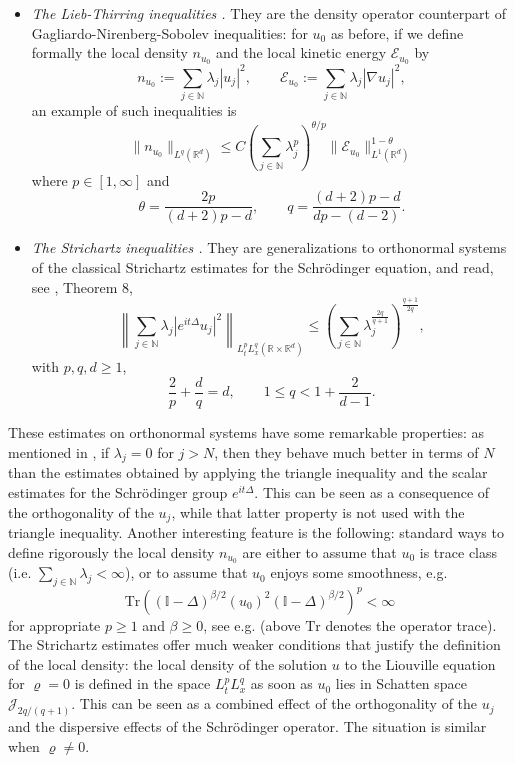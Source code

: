 \documentclass[12pt]{article}
\def \Rm {\mathbb R}
\def \Nm {\mathbb N}
\def\II{\mathbb{I}}
\newcommand{\calE}{\mathcal E}
\newcommand{\Tr}{\textrm{Tr}}
\newcommand{\calJ}{\mathcal J}
\newcommand{\be}{\begin{equation}}
\newcommand{\ee}{\end{equation}}
\begin{document}
\begin{itemize}
\item[-] \textit{The Lieb-Thirring inequalities \cite{LT,LP}.} They are the density operator counterpart of Gagliardo-Nirenberg-Sobolev inequalities: for $u_0$ as before, if we define formally the local density $n_{u_0}$ and the local kinetic energy $\calE_{u_0}$ by
$$
n_{u_0}:=\sum_{j \in \Nm} \lambda_j |u_j|^2, \qquad \calE_{u_0}:=\sum_{j \in \Nm} \lambda_j |\nabla u_j|^2,
$$
an example of such inequalities is 
$$
\|n_{u_0}\|_{L^q(\Rm^d)} \leq C \left(\sum_{j \in \Nm} \lambda_j^p \right)^{\theta/p} \|\calE_{u_0}\|^{1-\theta}_{L^1(\Rm^d)}
$$
where $p \in [1,\infty]$ and
$$
\theta=\frac{2p}{(d+2)p-d}, \qquad q=\frac{(d+2)p-d}{dp-(d-2)}.
$$
\item[-] \textit{The Strichartz inequalities \cite{LewStri,FrankSabin}.} They are generalizations to orthonormal systems of the classical Strichartz estimates for the Schr\"odinger equation, and read, see \cite{FrankSabin}, Theorem 8,
$$
\left\|\sum_{j \in \Nm} \lambda_j |e^{i t\Delta}u_j|^2 \right\|_{L^p_tL^q_x(\Rm\times \Rm^d)} \leq \left( \sum_{j \in \Nm} \lambda_j^{\frac{2q}{q+1}}\right)^{\frac{q+1}{2q}},$$
with $p,q,d \geq 1$,
$$
\frac{2}{p}+\frac{d}{q}=d, \qquad 1 \leq q <1+\frac{2}{d-1}.
$$
\end{itemize}

These estimates on orthonormal systems have some remarkable properties: as mentioned in \cite{LewStri,FrankSabin}, if $\lambda_j=0$ for $j>N$, then they behave much better in terms of $N$ than the estimates obtained by applying the triangle inequality and the scalar estimates for the Schr\"odinger group $e^{i t\Delta}$. This can be seen as a consequence of the orthogonality of the $u_j$, while that latter property is not used with the triangle inequality. Another interesting feature is the following: standard ways to define rigorously the local density $n_{u_0}$ are either to assume that $u_0$ is trace class (i.e. $\sum_{j \in \Nm} \lambda_j < \infty$), or to assume that $u_0$ enjoys some smoothness, e.g. 
\be \label{regu0}\Tr \left((\II-\Delta)^{\beta/2} (u_0)^2 (\II-\Delta)^{\beta/2}\right)^p < \infty
\ee 
for appropriate $p \geq 1$ and $\beta\geq 0$, see e.g. \cite{sabin1} (above $\Tr$ denotes the operator trace). The Strichartz estimates offer much weaker conditions that justify the definition of the local density: the local density of the solution $u$ to the Liouville equation for $\varrho=0$ is defined in the space $L^p_tL^q_x$ as soon as $u_0$ lies in Schatten space $\calJ_{2q/(q+1)}$. This can be seen as a combined effect of the orthogonality of the $u_j$ and the dispersive effects of the Schr\"odinger operator. The situation is similar when $\varrho \neq 0$.\\
\end{document}
